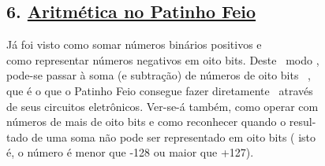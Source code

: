 \documentclass[a4paper,12pt]{article}
\begin{document}
\newpage

\subsection*{6. \uline{Aritmética no Patinho Feio}}

Já foi visto como somar números binários positivos e\\
como representar números negativos em oito bits. Deste \ modo ,\\
pode-se passar à soma (e subtração) de números de oito bits \ ,\\
que é o que o Patinho Feio consegue fazer diretamente \ através\\
de seus circuitos eletrônicos. Ver-se-á também, como operar com\\
números de mais de oito bits e como reconhecer quando o resul-\\
tado de uma soma não pode ser representado em oito bits ( isto\\
é, o número é menor que -128 ou maior que +127).
\end{document}
